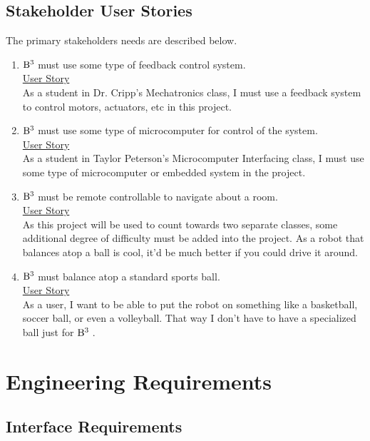\documentclass[12pt,a4paper]{article}
\newcommand{\BBB}{${\rm B}^3\;$}
\begin{document}
\begin{flushleft}
		\subsection{Stakeholder User Stories}
		The primary stakeholders needs are described below.
		\begin{enumerate}
			\item \BBB must use some type of feedback control system.\\
			\vspace{1em}
			\underline{User Story}\\
			As a student in Dr. Cripp's Mechatronics class, I must use a feedback system to control motors, actuators, etc in this project.
			
			\item \BBB must use some type of microcomputer for control of the system.	\\	
			\vspace{1em}
			\underline{User Story}\\
			As a student in Taylor Peterson's Microcomputer Interfacing class, I must use some type of microcomputer or embedded system in the project.
			
			\item \BBB must be remote controllable to navigate about a room.\\
			\vspace{1em}
			\underline{User Story}\\
			As this project will be used to count towards two separate classes, some additional degree of difficulty must be added into the project. As a robot that balances atop a ball is cool, it'd be much better if you could drive it around.
			
			\item \BBB must balance atop a standard sports ball.\\
			\vspace{1em}
			\underline{User Story}\\
			As a user, I want to be able to put the robot on something like a basketball, soccer ball, or even a volleyball. That way I don't have to have a specialized ball just for \BBB.			
		\end{enumerate}
		
		\pagebreak
		\section{Engineering Requirements}
			\subsection{Interface Requirements}

\end{flushleft}
\end{document}
